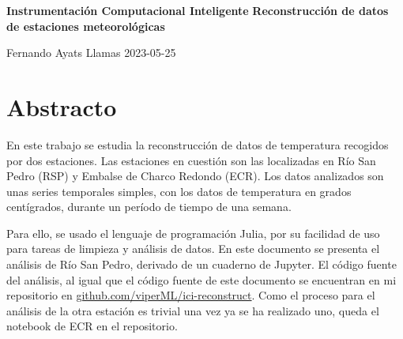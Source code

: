 \begin{center}
    \Large
    \textbf{Instrumentación Computacional Inteligente}
    \textbf{Reconstrucción de datos de estaciones meteorológicas}

    \vspace{0.3cm}
    \Large
    Fernando Ayats Llamas
    \vspace{0.3cm}
    2023-05-25
\end{center}

\tableofcontents

\section{Abstracto}

En este trabajo se estudia la reconstrucción de datos de temperatura recogidos
por dos estaciones. Las estaciones en cuestión son las localizadas en Río San
Pedro (RSP) y Embalse de Charco Redondo (ECR). Los datos analizados son unas
series temporales simples, con los datos de temperatura en grados centígrados,
durante un período de tiempo de una semana.

Para ello, se usado el lenguaje de programación Julia, por su facilidad de uso
para tareas de limpieza y análisis de datos. En este documento se presenta el
análisis de Río San Pedro, derivado de un cuaderno de Jupyter. El código fuente
del análisis, al igual que el código fuente de este documento se encuentran en
mi repositorio en \href{https://github.com/viperML/ici-reconstruct}{github.com/viperML/ici-reconstruct}. Como el
proceso para el análisis de la otra estación es trivial una vez ya se ha
realizado uno, queda el notebook de ECR en el repositorio.

